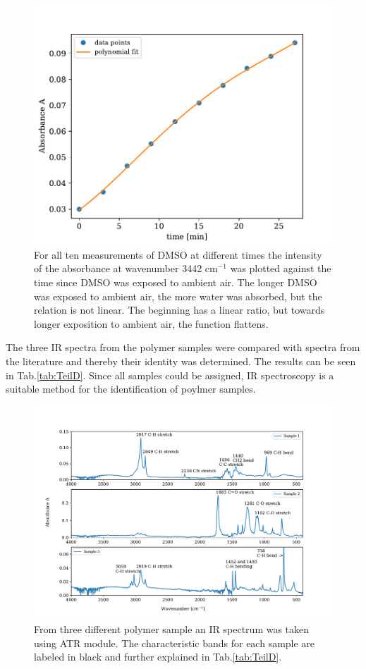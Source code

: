 \documentclass[a4paper,abstracton]{article}	                       %
\begin{document}
\begin{figure}[H]
\centering
 \includegraphics[scale=0.9] {TeilC2.pdf}
\caption{\label{fig:TeilC2} For all ten measurements of DMSO at different times the intensity of the absorbance at wavenumber 3442 cm$^{-1}$ was plotted against the time since DMSO was exposed to ambient air. The longer DMSO was exposed to ambient air, the more water was absorbed, but the relation is not linear. The beginning has a linear ratio, but towards longer exposition to ambient air, the function flattens.}
\end{figure}
\clearpage

The three IR spectra from the polymer samples were compared with spectra from the literature and thereby  their identity was determined. The results can be seen in Tab.\ref{tab:TeilD}. Since all samples could be assigned, IR spectroscopy is a suitable method for the identification of poylmer samples.

\begin{figure}[H]
\centering
 \includegraphics[width=\textwidth] {TeilD.pdf}
\caption{\label{fig:TeilD}From three different polymer sample an IR spectrum was taken using ATR module. The characteristic bands for each sample are labeled in black and further explained in Tab.\ref{tab:TeilD}.} 
\end{figure}
\end{document}

